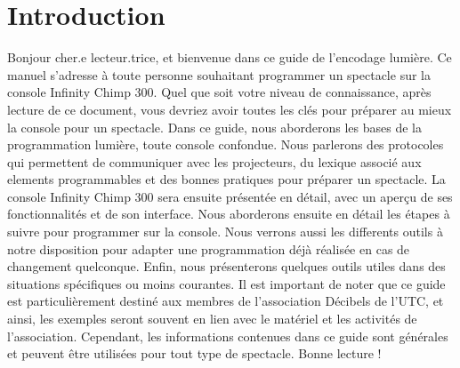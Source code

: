 \chapter{Introduction}
\label{chap:introduction}

Bonjour cher.e lecteur.trice, et bienvenue dans ce guide de l'encodage lumière.
Ce manuel s'adresse à toute personne souhaitant programmer un spectacle sur la console Infinity Chimp 300.
Quel que soit votre niveau de connaissance, après lecture de ce document, vous devriez avoir toutes les clés pour préparer au mieux la console pour un spectacle.
\newline
\newline
Dans ce guide, nous aborderons les bases de la programmation lumière, toute console confondue.
Nous parlerons des protocoles qui permettent de communiquer avec les projecteurs, du lexique associé aux elements programmables et des bonnes pratiques pour préparer un spectacle.
\newline
La console Infinity Chimp 300 sera ensuite présentée en détail, avec un aperçu de ses fonctionnalités et de son interface.
\newline
Nous aborderons ensuite en détail les étapes à suivre pour programmer sur la console.
\newline
Nous verrons aussi les differents outils à notre disposition pour adapter une programmation déjà réalisée en cas de changement quelconque.
\newline
Enfin, nous présenterons quelques outils utiles dans des situations spécifiques ou moins courantes.
\newline
\newline
Il est important de noter que ce guide est particulièrement destiné aux membres de l'association Décibels de l'UTC,
et ainsi, les exemples seront souvent en lien avec le matériel et les activités de l'association.
Cependant, les informations contenues dans ce guide sont générales et peuvent être utilisées pour tout type de spectacle.
\newline
\newline
Bonne lecture !

